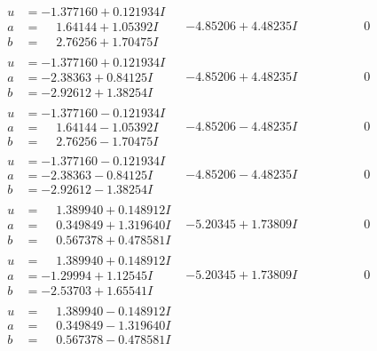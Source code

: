 \documentclass[1p]{elsarticle_modified}
\theoremstyle{definition}
\begin{document}
$$\begin{array}{c|c|c}
 \hline 
\begin{aligned}
u &= -1.377160 + 0.121934 I \\
a &= \phantom{-}1.64144 + 1.05392 I \\
b &= \phantom{-}2.76256 + 1.70475 I\end{aligned}
 & -4.85206 + 4.48235 I & \phantom{-0.000000 } 0 \\ \hline\begin{aligned}
u &= -1.377160 + 0.121934 I \\
a &= -2.38363 + 0.84125 I \\
b &= -2.92612 + 1.38254 I\end{aligned}
 & -4.85206 + 4.48235 I & \phantom{-0.000000 } 0 \\ \hline\begin{aligned}
u &= -1.377160 - 0.121934 I \\
a &= \phantom{-}1.64144 - 1.05392 I \\
b &= \phantom{-}2.76256 - 1.70475 I\end{aligned}
 & -4.85206 - 4.48235 I & \phantom{-0.000000 } 0 \\ \hline\begin{aligned}
u &= -1.377160 - 0.121934 I \\
a &= -2.38363 - 0.84125 I \\
b &= -2.92612 - 1.38254 I\end{aligned}
 & -4.85206 - 4.48235 I & \phantom{-0.000000 } 0 \\ \hline\begin{aligned}
u &= \phantom{-}1.389940 + 0.148912 I \\
a &= \phantom{-}0.349849 + 1.319640 I \\
b &= \phantom{-}0.567378 + 0.478581 I\end{aligned}
 & -5.20345 + 1.73809 I & \phantom{-0.000000 } 0 \\ \hline\begin{aligned}
u &= \phantom{-}1.389940 + 0.148912 I \\
a &= -1.29994 + 1.12545 I \\
b &= -2.53703 + 1.65541 I\end{aligned}
 & -5.20345 + 1.73809 I & \phantom{-0.000000 } 0 \\ \hline\begin{aligned}
u &= \phantom{-}1.389940 - 0.148912 I \\
a &= \phantom{-}0.349849 - 1.319640 I \\
b &= \phantom{-}0.567378 - 0.478581 I\end{aligned}

\end{array}$$
\end{document}
